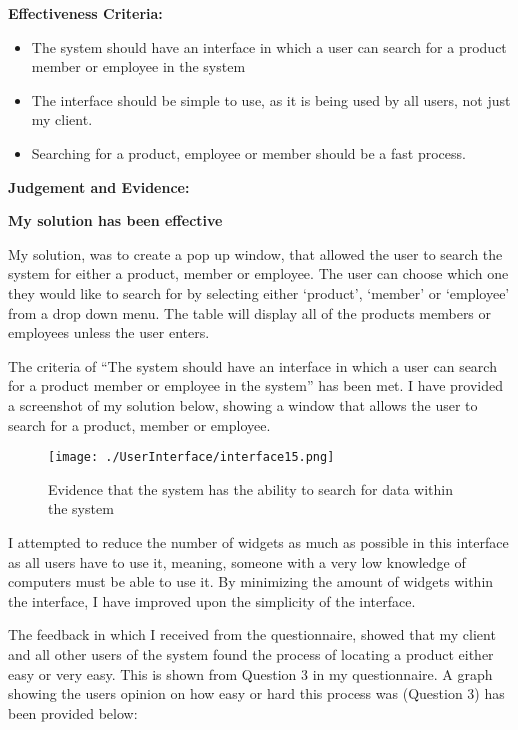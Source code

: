 \textbf{Effectiveness Criteria:}\newline
\begin{itemize}
	\item{The system should have an interface in which a user can search for a product member or employee in the system}
	\item{The interface should be simple to use, as it is being used by all users, not just my client.}
	\item{Searching for a product, employee or member should be a fast process.}
\end{itemize}

\textbf{Judgement and Evidence:} \newline

\textbf{\large{My solution has been effective}}

My solution, was to create a pop up window, that allowed the user to search the system for either a product, member or employee. The user can choose which one they would like to search for by selecting either `product', `member' or `employee' from a drop down menu. The table will display all of the products members or employees unless the user enters. 

The criteria of ``The system should have an interface in which a user can search for a product member or employee in the system'' has been met. I have provided a screenshot of my solution below, showing a window that allows the user to search for a product, member or employee.

\begin{figure}[H]
\caption{Evidence that the system has the ability to search for data within the system}
\hfill\texttt{[image: ./UserInterface/interface15.png]}
\end{figure}

I attempted to reduce the number of widgets as much as possible in this interface as all users have to use it, meaning, someone with a very low knowledge of computers must be able to use it. By minimizing the amount of widgets within the interface, I have improved upon the simplicity of the interface.

The feedback in which I received from the questionnaire, showed that my client and all other users of the system found the process of locating a product either easy or very easy. This is shown from Question 3 in my questionnaire. A graph showing the users opinion on how easy or hard this process was (Question 3) has been provided below:

